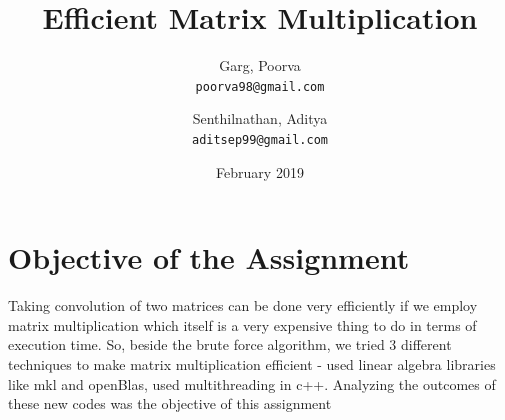 \documentclass{article}
\title{Efficient Matrix Multiplication}
\author{Garg, Poorva\\
    \texttt{poorva98@gmail.com}
    \and
    Senthilnathan, Aditya\\
    \texttt{aditsep99@gmail.com}}
\date{February 2019}
\begin{document}
\maketitle

\section*{Objective of the Assignment}
Taking convolution of two matrices can be done very efficiently if we employ matrix multiplication which itself is a very expensive thing to do in terms of execution time. So, beside the brute force algorithm, we tried 3 different techniques to make matrix multiplication efficient - used linear algebra libraries like mkl and openBlas, used multithreading in c++. Analyzing the outcomes of these new codes was the objective of this assignment
\end{document}
